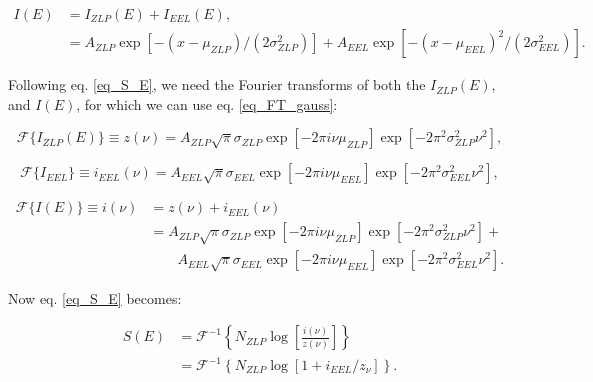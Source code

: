 \begin{equation}
\begin{aligned}
I(E) &= I_{ZLP}(E) + I_{EEL}(E),\\
&= A_{ZLP} \exp{[-(x-\mu_{ZLP})/(2\sigma_{ZLP}^2)]} +A_{EEL} \exp{[-(x-\mu_{EEL})^2/(2\sigma_{EEL}^2)]}.
\end{aligned}
\end{equation}

Following eq. \eqref{eq_S_E}, we need the Fourier transforms of both the $I_{ZLP}(E)$, and $I(E)$, for which we can use eq. \eqref{eq_FT_gauss}:

\begin{equation}\label{eq_i_nu_gauss}
    \mathcal{F}\{I_{ZLP}(E)\} \equiv z(\nu) = A_{ZLP} \sqrt{\pi}\sigma_{ZLP} \exp{\left[-2 \pi i \nu \mu_{ZLP}\right]} \exp{\left[-2 \pi^{2} \sigma_{ZLP}^{2} \nu^{2}\right]},
\end{equation}

\begin{equation}\label{eq_i_EEL_gauss}
    \mathcal{F}\{I_{EEL}\} \equiv i_{EEL}(\nu) = A_{EEL} \sqrt{\pi}\sigma_{EEL} \exp{\left[-2 \pi i \nu \mu_{EEL}\right]} \exp{\left[-2 \pi^{2} \sigma_{EEL}^{2} \nu^{2}\right]},
\end{equation}

\begin{equation}
\begin{aligned}
\mathcal{F}\{I(E)\} \equiv i(\nu) &= z(\nu) + i_{EEL}(\nu) \\
&= A_{ZLP} \sqrt{\pi}\sigma_{ZLP} \exp{\left[-2 \pi i \nu \mu_{ZLP}\right]} \exp{\left[-2 \pi^{2} \sigma_{ZLP}^{2} \nu^{2}\right]} + \\
& \quad \quad A_{EEL} \sqrt{\pi}\sigma_{EEL} \exp{\left[-2 \pi i \nu \mu_{EEL}\right]} \exp{\left[-2 \pi^{2} \sigma_{EEL}^{2} \nu^{2}\right]}.
\end{aligned}
\end{equation}



Now eq. \eqref{eq_S_E} becomes:

\begin{equation}\label{eq_S_gauss}
\begin{aligned}
S(E) &= \mathcal{F}^{-1}\left\{N_{ZLP}\operatorname{log}\left[\frac{i(\nu)}{z(\nu)}\right]\right\} \\
&= \mathcal{F}^{-1}\left\{N_{ZLP}\operatorname{log}\left[1+ i_{EEL}/z_{\nu}\right]\right\}.
\end{aligned}
\end{equation}

